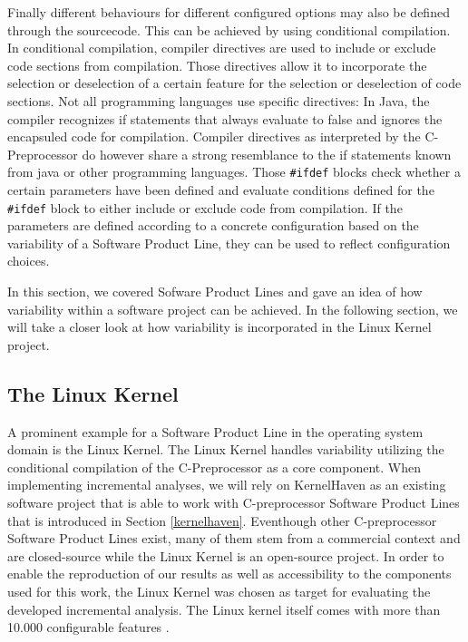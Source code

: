 \documentclass[a4paper]{article}
\begin{document}
Finally different behaviours for different configured options may also be defined through the sourcecode. This can be achieved by using conditional compilation. In conditional compilation, compiler directives are used to include or exclude code sections from compilation. Those directives allow it to incorporate the selection or deselection of a certain feature for the selection or deselection of code sections. Not all programming languages use specific directives: In Java, the compiler recognizes if statements that always evaluate to false and ignores the encapsuled code for compilation. Compiler directives as interpreted by the C-Preprocessor do however share a strong resemblance to the if statements known from java or other programming languages. Those \texttt{\#ifdef} blocks check whether a certain parameters have been defined and evaluate conditions defined for the \texttt{\#ifdef} block to either include or exclude code from compilation. If the parameters are defined according to a concrete configuration based on the variability of a Software Product Line, they can be used to reflect configuration choices.

In this section, we covered Sofware Product Lines and gave an idea of how variability within a software project can be achieved. In the following section, we will take a closer look at how variability is incorporated in the Linux Kernel project.

\subsection{The Linux Kernel}\label{linux-kernel}

A prominent example for a Software Product Line in the operating system domain is the Linux Kernel. The Linux Kernel handles variability utilizing the conditional compilation of the C-Preprocessor as a core component. When implementing incremental analyses, we will rely on KernelHaven \cite{KroeherEl-SharkawySchmid18} as an existing software project that is able to work with C-preprocessor Software Product Lines that is introduced in Section \ref{kernelhaven}. Eventhough other C-preprocessor Software Product Lines exist, many of them stem from a commercial context and are closed-source while the Linux Kernel is an open-source project. In order to enable the reproduction of our results as well as accessibility to the components used for this work, the Linux Kernel was chosen as target for evaluating the developed incremental analysis. The Linux kernel itself comes with more than 10.000 configurable features \cite{Tartler:2011:FCC:1966445.1966451}. 
\end{document}
